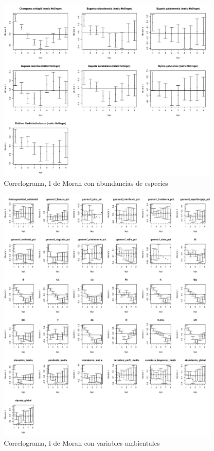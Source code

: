 \documentclass[11pt,]{article}
\begin{document}
\begin{figure}
\centering
\includegraphics{imoran_especies.png}
\caption{Correlograma, I de Moran con abundancias de especies
\label{fig:imoran_especies}}
\end{figure}

\begin{figure}
\centering
\includegraphics{imoran_variables.png}
\caption{Correlograma, I de Moran con variables ambientales
\label{fig:imoran_variables}}
\end{figure}
\end{document}
